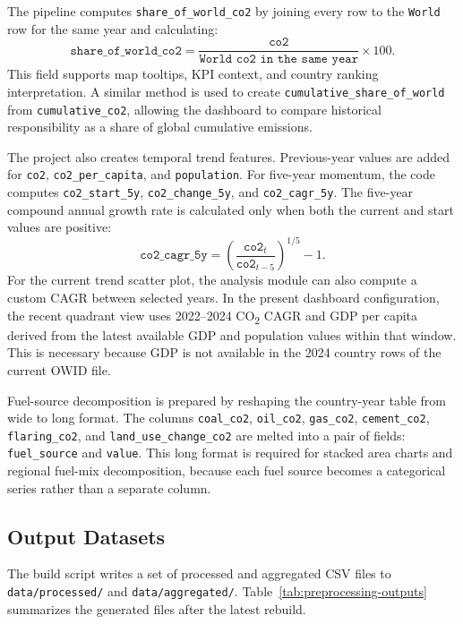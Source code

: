 \documentclass[a4paper,12pt]{article}
\begin{document}
The pipeline computes \texttt{share\_of\_world\_co2} by joining every row to the
\texttt{World} row for the same year and calculating:
\[
    \texttt{share\_of\_world\_co2}
    =
    \frac{\texttt{co2}}{\texttt{World co2 in the same year}} \times 100.
\]
This field supports map tooltips, KPI context, and country ranking interpretation. A
similar method is used to create \texttt{cumulative\_share\_of\_world} from
\texttt{cumulative\_co2}, allowing the dashboard to compare historical responsibility as
a share of global cumulative emissions.

The project also creates temporal trend features. Previous-year values are added for
\texttt{co2}, \texttt{co2\_per\_capita}, and \texttt{population}. For five-year momentum,
the code computes \texttt{co2\_start\_5y}, \texttt{co2\_change\_5y}, and
\texttt{co2\_cagr\_5y}. The five-year compound annual growth rate is calculated only when
both the current and start values are positive:
\[
    \texttt{co2\_cagr\_5y}
    =
    \left(\frac{\texttt{co2}_t}{\texttt{co2}_{t-5}}\right)^{1/5} - 1.
\]
For the current trend scatter plot, the analysis module can also compute a custom CAGR
between selected years. In the present dashboard configuration, the recent quadrant view
uses 2022--2024 CO\textsubscript{2} CAGR and GDP per capita derived from the latest
available GDP and population values within that window. This is necessary because GDP is
not available in the 2024 country rows of the current OWID file.

Fuel-source decomposition is prepared by reshaping the country-year table from wide to
long format. The columns \texttt{coal\_co2}, \texttt{oil\_co2}, \texttt{gas\_co2},
\texttt{cement\_co2}, \texttt{flaring\_co2}, and \texttt{land\_use\_change\_co2} are
melted into a pair of fields: \texttt{fuel\_source} and \texttt{value}. This long format
is required for stacked area charts and regional fuel-mix decomposition, because each fuel
source becomes a categorical series rather than a separate column.

\subsection{Output Datasets}

The build script writes a set of processed and aggregated CSV files to
\texttt{data/processed/} and \texttt{data/aggregated/}. Table~\ref{tab:preprocessing-outputs}
summarizes the generated files after the latest rebuild.
\end{document}
